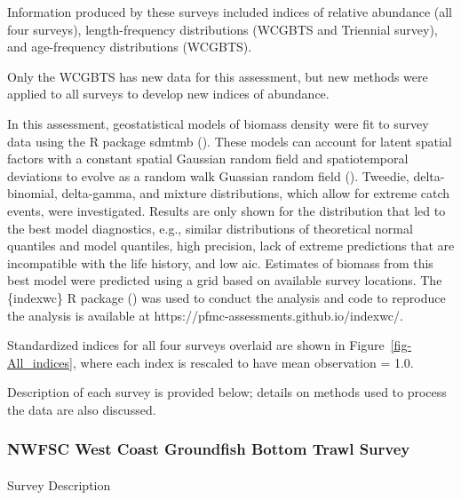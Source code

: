 \documentclass[
]{scrartcl}
\makeatletter
\let\oldparagraph\paragraph
\renewcommand{\paragraph}{
    \@ifstar
      \xxxParagraphStar
      \xxxParagraphNoStar
  }
\newcommand{\xxxParagraphStar}[1]{\oldparagraph*{#1}\mbox{}}
\newcommand{\xxxParagraphNoStar}[1]{\oldparagraph{#1}\mbox{}}
\makeatother
\begin{document}
Information produced by these surveys included indices of relative
abundance (all four surveys), length-frequency distributions (WCGBTS and
Triennial survey), and age-frequency distributions (WCGBTS).

Only the WCGBTS has new data for this assessment, but new methods were
applied to all surveys to develop new indices of abundance.

In this assessment, geostatistical models of biomass density were fit to
survey data using the R package \gls{sdmtmb}
(). These models
can account for latent spatial factors with a constant spatial Gaussian
random field and spatiotemporal deviations to evolve as a random walk
Guassian random field (). Tweedie, delta-binomial, delta-gamma, and mixture
distributions, which allow for extreme catch events, were investigated.
Results are only shown for the distribution that led to the best model
diagnostics, e.g., similar distributions of theoretical normal quantiles
and model quantiles, high precision, lack of extreme predictions that
are incompatible with the life history, and low \gls{aic}. Estimates of
biomass from this best model were predicted using a grid based on
available survey locations. The \{indexwc\} R package
()
was used to conduct the analysis and code to reproduce the analysis is
available at https://pfmc-assessments.github.io/indexwc/.

Standardized indices for all four surveys overlaid are shown in
Figure~\ref{fig-All_indices}, where each index is rescaled to have mean
observation = 1.0.

Description of each survey is provided below; details on methods used to
process the data are also discussed.

\subsubsection{NWFSC West Coast Groundfish Bottom Trawl
Survey}\label{nwfsc-west-coast-groundfish-bottom-trawl-survey}

\paragraph{Survey Description}\label{survey-description}
\end{document}
